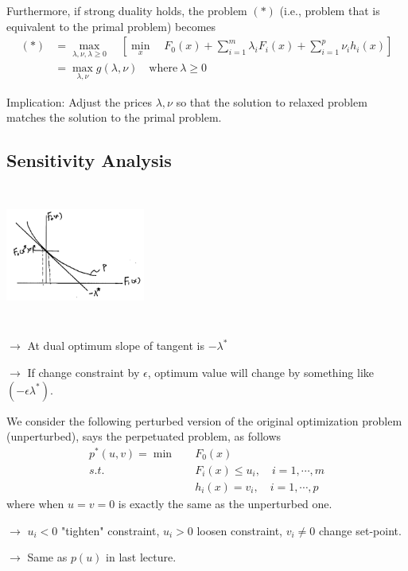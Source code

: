 Furthermore, if strong duality holds, the problem $(*)$ (i.e., problem that is equivalent to the primal problem) becomes
\begin{align*}
	(*) 
	&= \max_{\lambda, \nu, \lambda \geq 0}\quad [\min_x\quad F_0(x) + \sum^m_{i=1}\lambda_iF_i(x) + \sum^p_{i=1}\nu_ih_i(x)]\\
	&= \max_{\lambda, \nu} g(\lambda, \nu) \quad \text{where}\ \lambda \geq 0
\end{align*}

Implication: Adjust the prices $\lambda, \nu$ so that the solution to relaxed problem matches the solution to the primal problem.
\subsection{Sensitivity Analysis}
\begin{marginfigure}
	\centering
	\includegraphics[width=1.8in,height=1.8in]{figures/ch10/figure1127_4.png}
\end{marginfigure}

\quad $\rightarrow$ At dual optimum slope of tangent is $-\lambda^*$

$\rightarrow$
If change constraint by $\epsilon$, optimum value will change by something like $(-\epsilon \lambda^*)$.


We consider the following perturbed version of the original optimization problem (unperturbed), says the perpetuated problem, as follows
\begin{align*}
	p^*(u,v) = \min \quad &F_0(x) \\
	s.t.\quad & F_i(x) \leq u_i ,\quad i = 1,\cdots,m\\
	& h_i(x) = v_i,\quad i = 1,\cdots, p
\end{align*}
where when $u=v=0$ is exactly the same as the unperturbed one.

$\rightarrow$ $u_i<0$ "tighten" constraint, $u_i>0$ loosen constraint, $v_i\neq 0$ change set-point.

$\rightarrow$ Same as $p(u)$ in last lecture.

